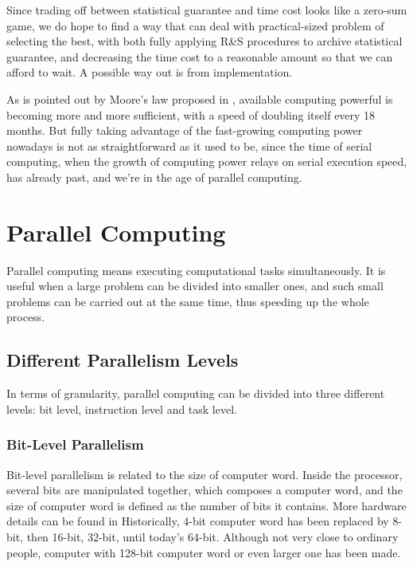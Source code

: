 \documentclass[12pt,a4paper]{report}
\begin{document}
Since trading off between statistical guarantee and time cost looks like a zero-sum game, we do hope to find a way that can deal with practical-sized problem of selecting the best, with both fully applying R\&S procedures to archive statistical guarantee, and decreasing the time cost to a reasonable amount so that we can afford to wait. A possible way out is from implementation.

As is pointed out by Moore's law proposed in \cite{moore}, available computing powerful is becoming more and more sufficient, with a speed of doubling itself every 18 months. But fully taking advantage of the fast-growing computing power nowadays is not as straightforward as it used to be, since the time of serial computing, when the growth of computing power relays on serial execution speed, has already past, and we're in the age of parallel computing.

\chapter{Parallel Computing}

Parallel computing means executing computational tasks simultaneously. It is useful when a large problem can be divided into smaller ones, and such small problems can be carried out at the same time, thus speeding up the whole process.

\section{Different Parallelism Levels}

In terms of granularity, parallel computing can be divided into three different levels: bit level, instruction level and task level.

\subsection{Bit-Level Parallelism}

Bit-level parallelism is related to the size of computer word. Inside the processor, several bits are manipulated together, which composes a computer word, and the size of computer word is defined as the number of bits it contains. More hardware details can be found in \cite{pca97} Historically, 4-bit computer word has been replaced by 8-bit, then 16-bit, 32-bit, until today's 64-bit. Although not very close to ordinary people, computer with 128-bit computer word or even larger one has been made.
\end{document}
